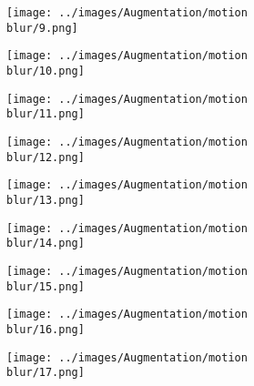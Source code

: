 \begin{figure}[H]
\begin{subfigure}[b]{0.1\textwidth}
 \end{subfigure}
 \hspace{1em}%
 \begin{subfigure}[b]{0.1\textwidth}
   \centering
   \texttt{[image: ../images/Augmentation/motion blur/9.png]}
 \end{subfigure}
 \hspace{1em}%
 \begin{subfigure}[b]{0.1\textwidth}
   \centering
   \texttt{[image: ../images/Augmentation/motion blur/10.png]}
 \end{subfigure}
 \hspace{1em}%
 \begin{subfigure}[b]{0.1\textwidth}
   \centering
   \texttt{[image: ../images/Augmentation/motion blur/11.png]}
 \end{subfigure}
 \hspace{1em}%
 \begin{subfigure}[b]{0.1\textwidth}
 \centering
 \texttt{[image: ../images/Augmentation/motion blur/12.png]}
 \end{subfigure}
 \hspace{1em}%
 \begin{subfigure}[b]{0.1\textwidth}
   \centering
   \texttt{[image: ../images/Augmentation/motion blur/13.png]}
 \end{subfigure}
 \hspace{1em}%
 \begin{subfigure}[b]{0.1\textwidth}
   \centering
   \texttt{[image: ../images/Augmentation/motion blur/14.png]}
 \end{subfigure}
 \hspace{1em}%
 \begin{subfigure}[b]{0.1\textwidth}
   \centering
   \texttt{[image: ../images/Augmentation/motion blur/15.png]}
 \end{subfigure}
 \hspace{1em}%
 \begin{subfigure}[b]{0.1\textwidth}
 \centering
 \texttt{[image: ../images/Augmentation/motion blur/16.png]}
 \end{subfigure}
 \hspace{1em}%
 \begin{subfigure}[b]{0.1\textwidth}
 \centering
 \texttt{[image: ../images/Augmentation/motion blur/17.png]}
\end{subfigure}

\end{figure}
